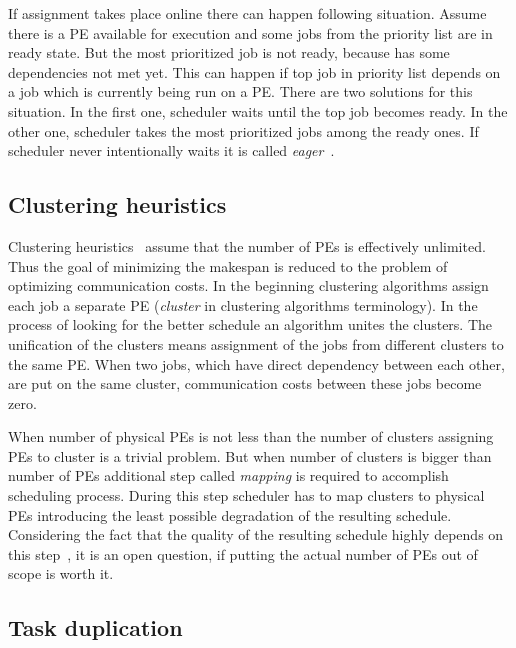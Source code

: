 If assignment takes place online there can happen following
situation. Assume there is a PE available for execution and some jobs
from the priority list are in ready state. But the most prioritized
job is not ready, because has some dependencies not met yet. This can
happen if top job in priority list depends on a job which is currently
being run on a PE. There are two solutions for this situation. In the
first one, scheduler waits until the top job becomes ready. In the
other one, scheduler takes the most prioritized jobs among the ready
ones. If scheduler never intentionally waits it is called
\emph{eager}~\cite{canon2007comparison}.

\subsection{Clustering heuristics}
\label{sec:clustering}


Clustering
heuristics~\cite{singh2008workflow,liou1996efficient,kwok1999static,gerasoulis1992comparison,mahjoub2011computational}
assume that the number of PEs is effectively unlimited. Thus the goal
of minimizing the makespan is reduced to the problem of optimizing
communication costs. In the beginning clustering algorithms assign
each job a separate PE (\emph{cluster} in clustering algorithms
terminology). In the process of looking for the better schedule an
algorithm unites the clusters. The unification of the clusters means
assignment of the jobs from different clusters to the same PE. When
two jobs, which have direct dependency between each other, are put on
the same cluster, communication costs between these jobs become zero.

When number of physical PEs is not less than the number of clusters
assigning PEs to cluster is a trivial problem. But when number of
clusters is bigger than number of PEs additional step called
\emph{mapping} is required to accomplish scheduling process. During
this step scheduler has to map clusters to physical PEs introducing
the least possible degradation of the resulting schedule. Considering
the fact that the quality of the resulting schedule highly depends on
this step~\cite{kwok1999static}, it is an open question,
if putting the actual number of PEs out of scope is worth it.

\subsection{Task duplication}
\label{sec:duplication}

